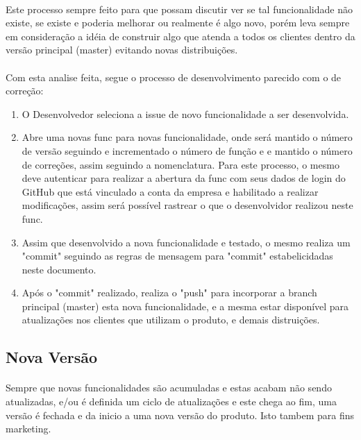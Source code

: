 \documentclass[	DIV=calc,%
							paper=a4,%
							fontsize=12pt,%
							onecolumn]{scrartcl}	 					%
\begin{document}
\paragraph{}
Este processo sempre feito para que possam discutir ver se tal funcionalidade não existe, se existe e poderia melhorar ou realmente é algo novo, porém leva sempre em consideração a idéia de construir algo que atenda a todos os clientes dentro da versão principal (master) evitando novas distribuições.
\paragraph{}
Com esta analise feita, segue o processo de desenvolvimento parecido com o de correção:
\begin{enumerate}
	\item O Desenvolvedor seleciona a issue de novo funcionalidade a ser desenvolvida.
	\item Abre uma novas func para novas funcionalidade, onde será mantido o número de versão seguindo e incrementado o  número de função e e mantido o número de correções, assim seguindo a nomenclatura. Para este processo, o mesmo deve autenticar para realizar a abertura da func com seus dados de login do GitHub que está vinculado a conta da empresa e habilitado a realizar modificações, assim será possível rastrear o que o desenvolvidor realizou neste func.
	\item Assim que desenvolvido a nova funcionalidade e testado, o mesmo realiza um "commit" seguindo as regras de mensagem para "commit" estabelicidadas neste documento.
	\item Após o "commit" realizado, realiza o "push" para incorporar a branch principal (master) esta nova funcionalidade, e a mesma estar disponível para atualizações nos clientes que utilizam o produto, e demais distruições.
\end{enumerate}

\subsection{Nova Versão}
\paragraph{}
Sempre que novas funcionalidades são acumuladas e estas acabam não sendo atualizadas, e/ou é definida um ciclo de atualizações e este chega ao fim, uma versão é fechada e da inicio a uma nova versão do produto. Isto tambem para fins marketing. 
\end{document}
